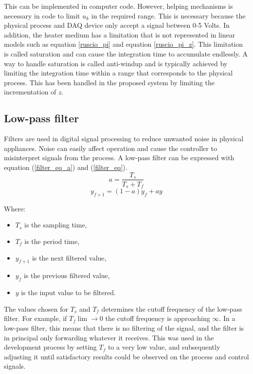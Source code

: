 \documentclass[conference]{IEEEtran}
\begin{document}
This can be implemented in computer code. However, helping mechanisms is necessary in code to limit $u_k$ in the required range. This is necessary because the physical process and DAQ device only accept a signal between 0-5 Volts. In addition, the heater medium has a limitation that is not represented in linear models such as equation \ref{ruscio_pi} and equation \ref{ruscio_pi_z}. This limitation is called saturation and can cause the integration time to accumulate endlessly. A way to handle saturation is called anti-windup and is typically achieved by limiting the integration time within a range that corresponds to the physical process. This has been handled in the proposed system by limiting the incrementation of $z$.

\subsection{Low-pass filter}
Filters are used in digital signal processing to reduce unwanted noise in physical appliances. Noise can easily affect operation and cause the controller to misinterpret signals from the process. A low-pass filter can be expressed with equation (\ref{filter_eq_a}) and (\ref{filter_eq}).
\begin{equation}
    \label{filter_eq_a}
    a = \frac{T_s}{T_s + T_f}
\end{equation}
\begin{equation}
    \label{filter_eq}
    y_{f+1} = (1 - a) y_{f} + a y
\end{equation}

Where:
\begin{itemize}
    \item[] $T_s$ is the sampling time,
    \item[] $T_f$ is the period time,
    \item[] $y_{f+1}$ is the next filtered value,
    \item[] $y_{f}$ is the previous filtered value,
    \item[] $y$ is the input value to be filtered.
\end{itemize}

The values chosen for $T_s$ and $T_f$ determines the cutoff frequency of the low-pass filter. For example, if $T_f \lim \rightarrow 0$ the cutoff frequency is approaching $\infty$. In a low-pass filter, this means that there is no filtering of the signal, and the filter is in principal only forwarding whatever it receives. This was used in the development process by setting $T_f$ to a very low value, and subsequently adjusting it until satisfactory results could be observed on the process and control signals.
\end{document}
